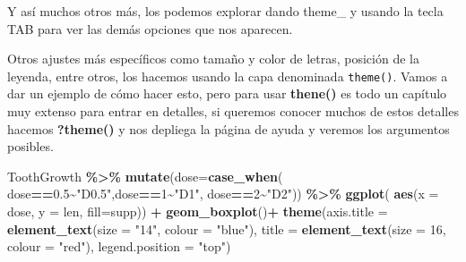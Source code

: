 \documentclass[
]{book}
\newenvironment{Shaded}{\begin{snugshade}}{\end{snugshade}}
\newcommand{\AttributeTok}[1]{\textcolor[rgb]{0.13,0.29,0.53}{#1}}
\newcommand{\DecValTok}[1]{\textcolor[rgb]{0.00,0.00,0.81}{#1}}
\newcommand{\FloatTok}[1]{\textcolor[rgb]{0.00,0.00,0.81}{#1}}
\newcommand{\FunctionTok}[1]{\textcolor[rgb]{0.13,0.29,0.53}{\textbf{#1}}}
\newcommand{\NormalTok}[1]{#1}
\newcommand{\SpecialCharTok}[1]{\textcolor[rgb]{0.81,0.36,0.00}{\textbf{#1}}}
\newcommand{\StringTok}[1]{\textcolor[rgb]{0.31,0.60,0.02}{#1}}
\begin{document}
\hfill\break

Y así muchos otros más, los podemos explorar dando theme\_ y usando la tecla TAB para ver las demás opciones que nos aparecen.

Otros ajustes más específicos como tamaño y color de letras, posición de la leyenda, entre otros, los hacemos usando la capa denominada \texttt{theme()}.
Vamos a dar un ejemplo de cómo hacer esto, pero para usar \textbf{thene()} es todo un capítulo muy extenso para entrar en detalles, si queremos conocer muchos de estos detalles hacemos \textbf{?theme()} y nos depliega la página de ayuda y veremos los argumentos posibles.

\begin{Shaded}
\begin{Highlighting}[]
\NormalTok{ToothGrowth }\SpecialCharTok{\%\textgreater{}\%}  \FunctionTok{mutate}\NormalTok{(}\AttributeTok{dose=}\FunctionTok{case\_when}\NormalTok{(}
\NormalTok{  dose}\SpecialCharTok{==}\FloatTok{0.5}\SpecialCharTok{\textasciitilde{}}\StringTok{"D0.5"}\NormalTok{,dose}\SpecialCharTok{==}\DecValTok{1}\SpecialCharTok{\textasciitilde{}}\StringTok{"D1"}\NormalTok{, dose}\SpecialCharTok{==}\DecValTok{2}\SpecialCharTok{\textasciitilde{}}\StringTok{"D2"}\NormalTok{)) }\SpecialCharTok{\%\textgreater{}\%} \FunctionTok{ggplot}\NormalTok{(}
    \FunctionTok{aes}\NormalTok{(}\AttributeTok{x =}\NormalTok{ dose, }\AttributeTok{y =}\NormalTok{ len, }\AttributeTok{fill=}\NormalTok{supp)) }\SpecialCharTok{+}  \FunctionTok{geom\_boxplot}\NormalTok{()}\SpecialCharTok{+} 
  \FunctionTok{theme}\NormalTok{(}\AttributeTok{axis.title =} \FunctionTok{element\_text}\NormalTok{(}\AttributeTok{size =} \StringTok{"14"}\NormalTok{, }\AttributeTok{colour =} \StringTok{"blue"}\NormalTok{),}
        \AttributeTok{title =} \FunctionTok{element\_text}\NormalTok{(}\AttributeTok{size =} \DecValTok{16}\NormalTok{, }\AttributeTok{colour =} \StringTok{"red"}\NormalTok{),}
        \AttributeTok{legend.position =} \StringTok{"top"}\NormalTok{)}
\end{Highlighting}
\end{Shaded}
\end{document}
